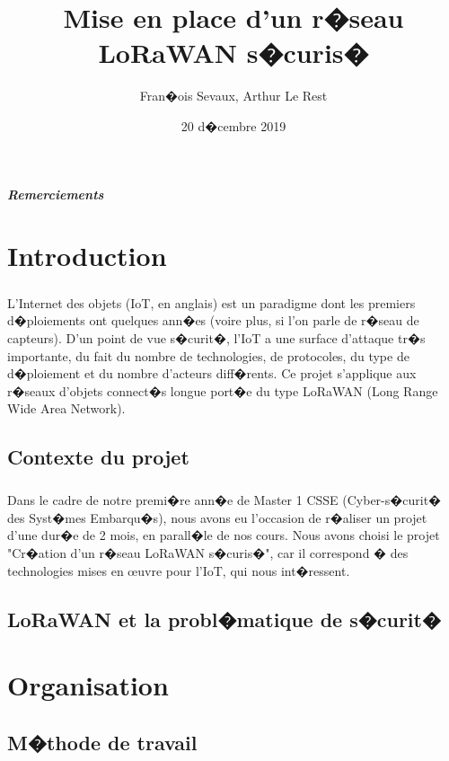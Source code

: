 \documentclass[a4paper, titlepage,12pt]{report}
\title{Mise en place d'un r�seau LoRaWAN s�curis�}      %
\author{Fran�ois Sevaux, Arthur Le Rest}           %
\date{20 d�cembre 2019}           %
\begin{document}


\paragraph{Remerciements}
\tableofcontents
\pagebreak


\chapter{Introduction}
\paragraph{}
L'Internet des objets (IoT, en anglais) est un paradigme dont les premiers d�ploiements ont quelques ann�es (voire plus, si l'on parle de r�seau de capteurs). D'un point de vue s�curit�, l'IoT a une surface d'attaque tr�s importante, du fait du nombre de technologies, de protocoles, du type de d�ploiement et du nombre d'acteurs diff�rents. Ce projet s'applique aux r�seaux d'objets connect�s longue port�e du type LoRaWAN (Long Range Wide Area Network).

\section{Contexte du projet}
\paragraph{}
Dans le cadre de notre premi�re ann�e de Master 1 CSSE (Cyber-s�curit� des Syst�mes Embarqu�s), nous avons eu l'occasion de r�aliser un projet d'une dur�e de 2 mois, en parall�le de nos cours. Nous avons choisi le projet "Cr�ation d'un r�seau LoRaWAN s�curis�", car il correspond � des technologies mises en \oe{}uvre pour l'IoT, qui nous int�ressent. 

\section{LoRaWAN et la probl�matique de s�curit�}
\paragraph{}


\chapter{Organisation}
\section{M�thode de travail}
\end{document}
